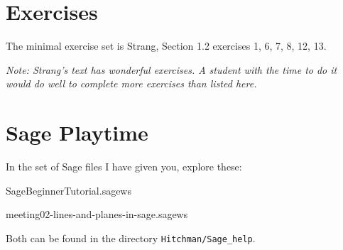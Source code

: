 \documentclass[12pt,letterpaper]{article}
\theoremstyle{definition}
\begin{document}
\section*{Exercises}
The minimal exercise set is Strang, Section 1.2 exercises 1, 6, 7, 8, 12, 13.

\emph{Note: Strang's text has wonderful exercises. A student with the time to do it would do well to complete more exercises than listed here.}


\section*{Sage Playtime}

In the set of Sage files I have given you, explore these:
\begin{compactitem}
\item SageBeginnerTutorial.sagews
\item meeting02-lines-and-planes-in-sage.sagews
\end{compactitem}
Both can be found in the directory \texttt{Hitchman/Sage\_help}.

\end{document}
